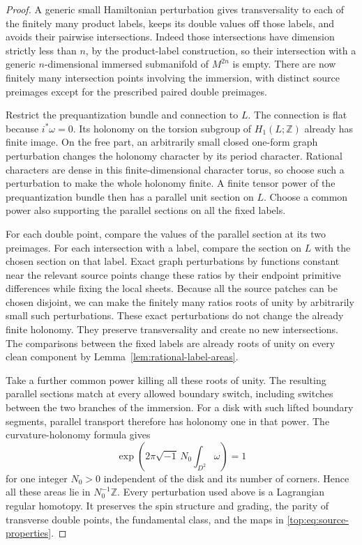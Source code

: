 \documentclass[11pt]{article}
\numberwithin{equation}{section}
\theoremstyle{definition}
\theoremstyle{remark}
\newcommand{\Z}{\mathbb Z}
\begin{document}
\begin{proof}
A generic small Hamiltonian perturbation gives
transversality to each of the finitely many product labels,
keeps its double values off those labels, and avoids their
pairwise intersections.  Indeed those intersections have
dimension strictly less than $n$, by the product-label
construction, so their intersection with a generic
$n$-dimensional immersed submanifold of $M^{2n}$ is empty.
There are now finitely many intersection points involving
the immersion, with distinct source preimages except for
the prescribed paired double preimages.

Restrict the prequantization bundle and connection to
$L$.  The connection is flat because $i^*\omega=0$.
Its holonomy on the torsion subgroup of $H_1(L;\Z)$
already has finite image.  On the free part, an arbitrarily
small closed one-form graph perturbation changes the
holonomy character by its period character.  Rational
characters are dense in this finite-dimensional character
torus, so choose such a perturbation to make the whole
holonomy finite.  A finite tensor power of the
prequantization bundle then has a parallel unit section
on $L$.  Choose a common power also supporting the
parallel sections on all the fixed labels.

For each double point, compare the values of the
parallel section at its two preimages.  For each
intersection with a label, compare the section on $L$
with the chosen section on that label.  Exact graph
perturbations by functions constant near the relevant
source points change these ratios by their endpoint
primitive differences while fixing the local sheets.
Because all the source patches can be chosen disjoint,
we can make the finitely many ratios roots of unity by
arbitrarily small such perturbations.  These exact
perturbations do not change the already finite holonomy.
They preserve transversality and create no new
intersections.  The comparisons between the fixed
labels are already roots of unity on every clean
component by Lemma~\ref{lem:rational-label-areas}.

Take a further common power killing all these roots of
unity.  The resulting parallel sections match at every
allowed boundary switch, including switches between
the two branches of the immersion.  For a disk with
such lifted boundary segments, parallel transport
therefore has holonomy one in that power.  The
curvature-holonomy formula gives
\[
                 \exp\left(2\pi\sqrt{-1}\,N_0
                         \int_{D^2}\omega\right)=1
\]
for one integer $N_0>0$ independent of the disk and its
number of corners.  Hence all these areas lie in
$N_0^{-1}\Z$.  Every perturbation used above is a
Lagrangian regular homotopy.  It preserves the spin
structure and grading, the parity of transverse
double points, the fundamental class, and the maps in
\eqref{top:eq:source-properties}.
\end{proof}
\end{document}

